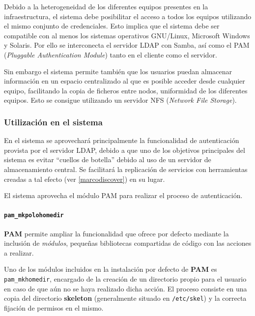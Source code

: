 Debido a la heterogeneidad de los diferentes equipos presentes en la infraestructura, el sistema debe posibilitar el acceso a todos los equipos utilizando el mismo conjunto de credenciales. Esto implica que el sistema debe ser compatible con al menos los sistemas operativos GNU/Linux, Microsoft Windows y Solaris. Por ello se interconecta el servidor LDAP con Samba, así como el PAM (\textit{Pluggable Authentication Module}) tanto en el cliente como el servidor.

Sin embargo el sistema permite también que los usuarios puedan almacenar información en un espacio centralizado al que es posible acceder desde cualquier equipo, facilitando la copia de ficheros entre nodos, uniformidad de los diferentes equipos. Esto se consigue utilizando un servidor NFS (\textit{Network File Storage}).

\subsubsection{Utilización en el sistema}

En el sistema se aprovechará principalmente la funcionalidad de autenticación provista por el servidor LDAP, debido a que uno de los objetivos principales del sistema es evitar ``cuellos de botella'' debido al uso de un servidor de almacenamiento central. Se facilitará la replicación de servicios con herramientas creadas a tal efecto (ver \ref{marcodiscover}) en su lugar.%

El sistema aprovecha el módulo PAM para realizar el proceso de autenticación.

\paragraph{\texttt{pam\_mkpolohomedir}\\}
\label{pam_mkpolohomedir}

\textbf{PAM} permite ampliar la funcionalidad que ofrece por defecto mediante la inclusión de \textit{módulos}, pequeñas bibliotecas compartidas de código con las acciones a realizar.

Uno de los módulos incluidos en la instalación por defecto de \textbf{PAM} es \texttt{pam\_mkhomedir}, encargado de la creación de un directorio propio para el usuario en caso de que aún no se haya realizado dicha acción. El proceso consiste en una copia del directorio \textbf{skeleton} (generalmente situado en \texttt{/etc/skel}) y la correcta fijación de permisos en el mismo.

